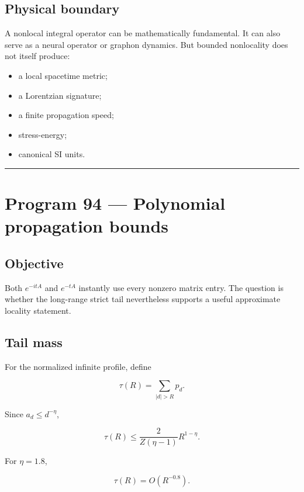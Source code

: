 \documentclass[11pt,a4paper,openany]{report}
\begin{document}
\section{Physical boundary}

A nonlocal integral operator can be mathematically fundamental. It can also serve as a neural operator or graphon dynamics. But bounded nonlocality does not itself produce:

\begin{itemize}
\item 
a local spacetime metric;

\item 
a Lorentzian signature;

\item 
a finite propagation speed;

\item 
stress-energy;

\item 
canonical SI units.

\end{itemize}

\par\medskip\hrule\medskip

\chapter{Program 94 --- Polynomial propagation bounds}

\section{Objective}

Both \(e^{-itA}\) and \(e^{-tA}\) instantly use every nonzero matrix entry. The question is whether the long-range strict tail nevertheless supports a useful approximate locality statement.

\section{Tail mass}

For the normalized infinite profile, define

\[
\tau(R)
=
\sum_{|d|>R}p_d.
\]

Since \(a_d\le d^{-\eta}\),

\[
\tau(R)
\le
\frac{2}{Z(\eta-1)}R^{1-\eta}.
\]

For \(\eta=1.8\),

\[
\tau(R)=O(R^{-0.8}).
\]
\end{document}
